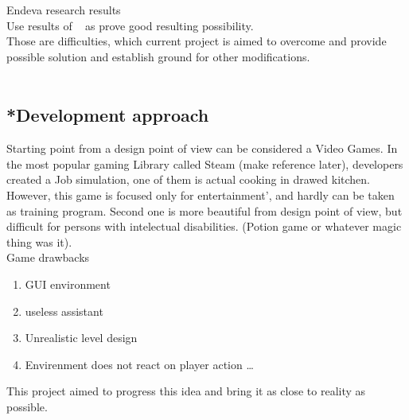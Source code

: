\documentclass[18pt]{article}
\numberwithin{equation}{section} %
\numberwithin{figure}{section} %
\numberwithin{table}{section} %
\begin{document}
	Endeva research results \\
	
	Use results of ~\cite{LOTAN2009229} as prove good resulting possibility. \\
	
	Those are difficulties, which current project is aimed to overcome and provide possible solution and establish ground for other modifications. \\ \\
	
	\subsection{*Development approach}
	Starting point from a design point of view can be considered a Video Games. In the most popular gaming Library called Steam (make reference later), developers created a Job simulation, one of them is actual cooking in drawed kitchen. However, this game is focused only for entertainment', and hardly can be taken as training program. Second one is more beautiful from design point of view, but difficult for persons with intelectual disabilities. (Potion game or whatever magic thing was it). \\
	
	Game drawbacks
	\begin{enumerate}
		\item GUI environment
		\item useless assistant
		\item Unrealistic level design
		\item Envirenment does not react on player action
		\ldots
	\end{enumerate}

	This project aimed to progress this idea and bring it as close to reality as possible. \\
	
\end{document}
